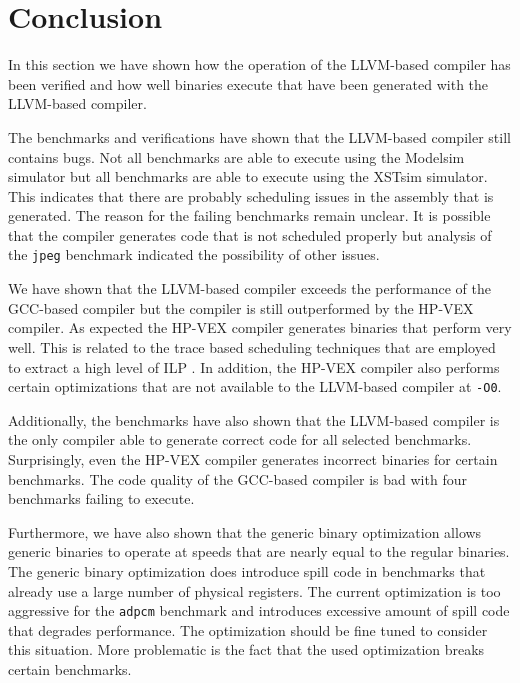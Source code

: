 \section{Conclusion}
In this section we have shown how the operation of the LLVM-based compiler has been verified and how well binaries execute that have been generated with the LLVM-based compiler.

The benchmarks and verifications have shown that the LLVM-based compiler still contains bugs. Not all benchmarks are able to execute using the Modelsim simulator but all benchmarks are able to execute using the XSTsim simulator. This indicates that there are probably scheduling issues in the assembly that is generated. The reason for the failing benchmarks remain unclear. It is possible that the compiler generates code that is not scheduled properly but analysis of the \texttt{jpeg} benchmark indicated the possibility of other issues. 

We have shown that the LLVM-based compiler exceeds the performance of the GCC-based compiler but the compiler is still outperformed by the HP-VEX compiler. As expected the HP-VEX compiler generates binaries that perform very well. This is related to the trace based scheduling techniques that are employed to extract a high level of ILP \cite{Lowney:1993qy}. In addition, the HP-VEX compiler also performs certain optimizations that are not available to the LLVM-based compiler at \texttt{-O0}.

Additionally, the benchmarks have also shown that the LLVM-based compiler is the only compiler able to generate correct code for all selected benchmarks. Surprisingly, even the HP-VEX compiler generates incorrect binaries for certain benchmarks. The code quality of the GCC-based compiler is bad with four benchmarks failing to execute.

Furthermore, we have also shown that the generic binary optimization allows generic binaries to operate at speeds that are nearly equal to the regular binaries. The generic binary optimization does introduce spill code in benchmarks that already use a large number of physical registers. The current optimization is too aggressive for the \texttt{adpcm} benchmark and introduces excessive amount of spill code that degrades performance. The optimization should be fine tuned to consider this situation. More problematic is the fact that the used optimization breaks certain benchmarks.

\acresetall
